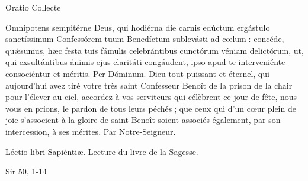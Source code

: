\begin{paracol}{2}
Oratio
\switchcolumn
Collecte
\switchcolumn*

Omnípotens sempitérne Deus,  qui hodiérna die carnis edúctum ergástulo sanctíssimum Confessórem tuum Benedíctum sublevásti ad cœlum : concéde, quǽsumus, hæc festa tuis fámulis celebrántibus cunctórum véniam delictórum, ut, qui exsultántibus ánimis ejus claritáti congáudent, ipso apud te interveniénte consociéntur et méritis. Per Dóminum.
\switchcolumn
Dieu tout-puissant et éternel, qui aujourd’hui avez tiré votre très saint Confesseur Benoît de la prison de la chair pour l’élever au ciel, accordez à vos serviteurs qui célèbrent ce jour de fête, nous vous en prions, le pardon de tous leurs péchés ; que ceux qui d’un cœur plein de joie s’associent à la gloire de saint Benoît soient associés également, par son intercession, à ses mérites. Par Notre-Seigneur.
\switchcolumn*

Léctio libri Sapiéntiæ.
\switchcolumn
Lecture du livre de la Sagesse.
\switchcolumn*

Sir 50, 1-14
\switchcolumn

\switchcolumn*


\end{paracol}
